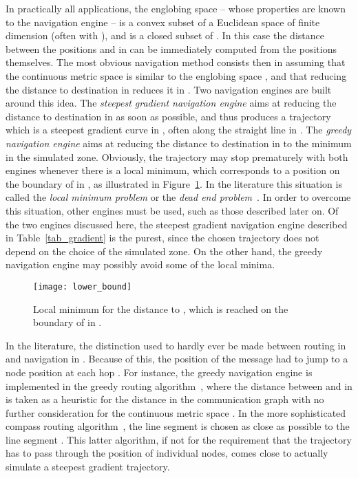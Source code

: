 \documentclass{article}
\begin{document}
In practically all applications, the englobing space  -- whose properties are known to the navigation engine -- is a convex subset of a Euclidean space of finite dimension  (often with ), and  is a closed subset of . In this case the distance between the positions  and  in  can be immediately computed from the positions themselves.
The most obvious navigation method consists then in assuming that the continuous metric space  is similar to the englobing space , and that reducing the distance to destination in  reduces it in . 
Two navigation engines are built around this idea. The {\em steepest gradient navigation engine} aims at reducing the distance to destination in  as soon as possible, and thus produces a trajectory which is a steepest gradient curve in , often along the straight line  in . The {\em greedy navigation engine} aims at reducing the distance to destination in  to the minimum in the simulated zone.
 Obviously, the trajectory may stop prematurely with both engines whenever there is a local minimum, which corresponds to a position on the boundary of  in , as illustrated in Figure~\ref{fig_lower_bound}. In the literature this situation is called the {\em local minimum problem} or the {\em dead end problem}~\cite{bib_book}.
 In order to overcome this situation, other engines must be used, such as those described later on. Of the two engines discussed here, the steepest gradient navigation engine described in Table~\ref{tab_gradient} is the purest, since the chosen trajectory does not depend on the choice of the simulated zone. On the other hand, the greedy navigation engine may possibly avoid some of the local minima.

\begin{figure}[h]
\begin{center}
\texttt{[image: lower\_bound]}
\caption{Local minimum for the distance to , which is reached on the boundary of  in .}
\label{fig_lower_bound}
\end{center}
\end{figure}


In the literature, the distinction used to hardly ever be made between routing in  and navigation in . Because of this, the position  of the message had to jump to a node position  at each hop . For instance, the greedy navigation engine is implemented in the greedy routing algorithm~\cite{bib_greedy}, where the distance between  and  in  is taken as a heuristic for the distance in the communication graph  with no further consideration for the continuous metric space .
In the more sophisticated compass routing algorithm~\cite{bib_compass}, the line segment  is chosen as close as possible to the line segment . This latter algorithm, if not for the requirement that the trajectory has to pass through the position of individual nodes, comes close to actually simulate a steepest gradient trajectory.
\end{document}
